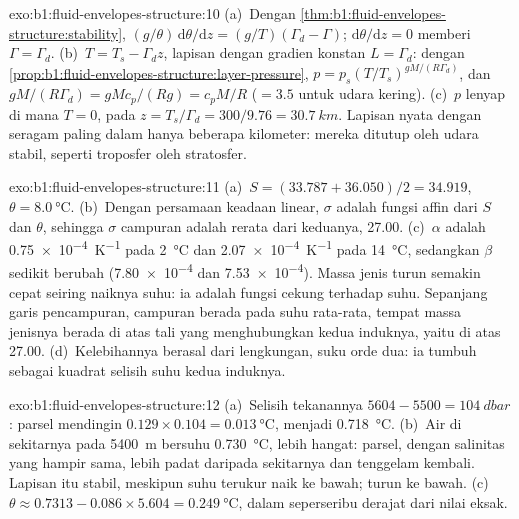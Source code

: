 \begin{solution}{exo:b1:fluid-envelopes-structure:10}
(a)~Dengan \cref{thm:b1:fluid-envelopes-structure:stability}, $(g/\theta)\,\mathrm
d\theta/\mathrm dz = (g/T)(\Gamma_d - \Gamma)$; $\mathrm d\theta/\mathrm dz = 0$
memberi $\Gamma = \Gamma_d$. (b)~$T = T_s - \Gamma_d z$, lapisan dengan gradien konstan
$L = \Gamma_d$: dengan \cref{prop:b1:fluid-envelopes-structure:layer-pressure}, $p =
p_s (T/T_s)^{gM/(R\Gamma_d)}$, dan $gM/(R\Gamma_d) = gMc_p/(Rg) = c_pM/R$
($= 3.5$ untuk udara kering). (c)~$p$ lenyap di mana $T = 0$, pada $z = T_s/\Gamma_d =
300/9.76 = \qty{30.7}{km}$. Lapisan nyata dengan  seragam paling
dalam hanya beberapa kilometer: mereka ditutup oleh udara stabil, seperti troposfer
oleh stratosfer.
\end{solution}

\begin{solution}{exo:b1:fluid-envelopes-structure:11}
(a)~$S = (33.787 + 36.050)/2 = 34.919$, $\theta = \qty{8.0}{\celsius}$.
(b)~Dengan persamaan keadaan linear, $\sigma$ adalah fungsi affin dari $S$ dan
$\theta$, sehingga $\sigma$ campuran adalah rerata dari keduanya, 27.00.
(c)~$\alpha$ adalah \qty{0.75e-4}{K^{-1}} pada \qty{2}{\celsius} dan
\qty{2.07e-4}{K^{-1}} pada \qty{14}{\celsius}, sedangkan $\beta$ sedikit berubah
(\num{7.80e-4} dan \num{7.53e-4}). Massa jenis turun semakin cepat seiring naiknya suhu:
ia adalah fungsi cekung terhadap suhu. Sepanjang garis pencampuran, campuran berada pada
suhu rata-rata, tempat massa jenisnya berada di atas tali yang menghubungkan kedua induknya,
yaitu di atas 27.00. (d)~Kelebihannya berasal dari lengkungan, suku orde dua: ia tumbuh
sebagai kuadrat selisih suhu kedua induknya.
\end{solution}

\begin{solution}{exo:b1:fluid-envelopes-structure:12}
(a)~Selisih tekanannya $5604 - 5500 = \qty{104}{dbar}$: parsel mendingin
$0.129 \times 0.104 = \qty{0.013}{\celsius}$, menjadi \qty{0.718}{\celsius}.
(b)~Air di sekitarnya pada \qty{5400}{m} bersuhu \qty{0.730}{\celsius}, lebih hangat: parsel,
dengan salinitas yang hampir sama, lebih padat daripada sekitarnya dan tenggelam kembali. Lapisan itu stabil, meskipun suhu terukur naik ke bawah;  turun ke bawah.
(c)~$\theta \approx
0.7313 - 0.086 \times 5.604 = \qty{0.249}{\celsius}$, dalam seperseribu derajat dari nilai eksak.
\end{solution}

